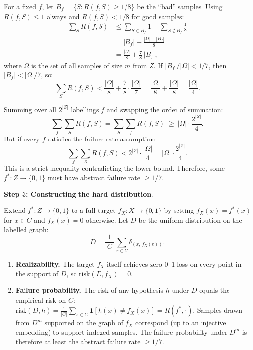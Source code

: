 \documentclass[11pt]{article}
\theoremstyle{remark}
\newcommand{\Bool}{\{0,1\}}
\newcommand{\card}[1]{|#1|}
\begin{document}
For a fixed $f$, let $B_f = \{S : R(f,S) \ge 1/8\}$ be the ``bad''
samples.  Using $R(f, S) \le 1$ always and $R(f, S) < 1/8$ for good
samples:
\begin{align*}
  \sum_{S} R(f, S)
  &\le \sum_{S \in B_f} 1 + \sum_{S \notin B_f} \frac{1}{8}
  \\
  &= \card{B_f} + \frac{\card{\Omega} - \card{B_f}}{8}
  \\
  &= \frac{\card{\Omega}}{8} + \frac{7}{8}\,\card{B_f},
\end{align*}
where $\Omega$ is the set of all samples of size $m$ from $Z$.  If
$\card{B_f}/\card{\Omega} < 1/7$, then $\card{B_f} < \card{\Omega}/7$,
so:
\[
  \sum_{S} R(f, S)
  < \frac{\card{\Omega}}{8} + \frac{7}{8} \cdot \frac{\card{\Omega}}{7}
  = \frac{\card{\Omega}}{8} + \frac{\card{\Omega}}{8}
  = \frac{\card{\Omega}}{4}.
\]

Summing over all $2^{\card{Z}}$ labellings $f$ and swapping the order of
summation:
\[
  \sum_{f} \sum_{S} R(f, S)
  = \sum_{S} \sum_{f} R(f, S)
  \;\ge\; \card{\Omega} \cdot \frac{2^{\card{Z}}}{4}.
\]
But if every $f$ satisfies the failure-rate assumption:
\[
  \sum_{f} \sum_{S} R(f, S) < 2^{\card{Z}} \cdot \frac{\card{\Omega}}{4}
  = \card{\Omega} \cdot \frac{2^{\card{Z}}}{4}.
\]
This is a strict inequality contradicting the lower bound.  Therefore,
some $f^* : Z \to \Bool$ must have abstract failure rate $\ge 1/7$.

\medskip
\noindent\textbf{Step 3: Constructing the hard distribution.}

Extend $f^* : Z \to \Bool$ to a full target $f_X : X \to \Bool$ by
setting $f_X(x) = f^*(x)$ for $x \in C$ and $f_X(x) = 0$ otherwise.
Let $D$ be the uniform distribution on the labelled graph:
\[
  D = \frac{1}{\card{C}} \sum_{x \in C} \delta_{(x,\, f_X(x))}.
\]

\begin{enumerate}
  \item \textbf{Realizability.} The target $f_X$ itself achieves zero
        0--1 loss on every point in the support of $D$, so
        $\mathrm{risk}(D, f_X) = 0$.

  \item \textbf{Failure probability.} The risk of any hypothesis $h$
        under $D$ equals the empirical risk on $C$:
        $\mathrm{risk}(D, h) = \frac{1}{\card{C}} \sum_{x \in C}
        \mathbf{1}[h(x) \ne f_X(x)] = R(f^*, \cdot)$.
        Samples drawn from $D^m$ supported on the graph of $f_X$
        correspond (up to an injective embedding) to support-indexed
        samples.  The failure probability under $D^m$ is therefore at
        least the abstract failure rate $\ge 1/7$.
\end{enumerate}
\end{document}
